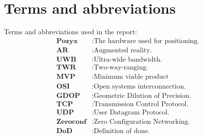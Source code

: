 \chapter*{Terms and abbreviations}
Terms and abbreviations used in the report:
\begin{align*}
    \textbf{Pozyx}    & : \text{The hardware used for positioning.} \\
    \textbf{AR}       & : \text{Augmented reality.}                 \\
    \textbf{UWB}      & : \text{Ultra-wide bandwidth.}              \\
    \textbf{TWR}      & : \text{Two-way-ranging.}                   \\
    \textbf{MVP}      & : \text{Minimum viable product}             \\
    \textbf{OSI}      & : \text{Open systems interconnection.}      \\
    \textbf{GDOP}     & : \text{Geometric Dilution of Precision.}   \\
    \textbf{TCP}      & : \text{Transmission Control Protocol.}     \\
    \textbf{UDP}      & : \text{User Datagram Protocol.}            \\
    \textbf{Zeroconf} & : \text{Zero Configuration Networking.}     \\
    \textbf{DoD}      & : \text{Definition of done.}                \\
\end{align*}